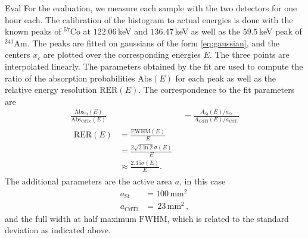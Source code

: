 Eval
For the evaluation, we measure each sample with the two detectors for 
one hour each. The calibration of the histogram to actual energies is 
done with the known peaks of $^{57}$Co at $122.06\,$keV and $136.47\,$keV 
as well as the $59.5\,$keV peak of $^{241}$Am. The peaks are fitted on 
gaussians of the form \eqref{eq:gaussian}, and the centers $x_c$ are 
plotted over the corresponding energies $E$. The three points 
are interpolated linearly. 
The parameters obtained by the fit are used to compute
the ratio of the absorption probabilities $\mathrm{Abs}(E)$ for each peak 
as well as the relative energy resolution $\mathrm{RER}(E)$.
The correspondence to the fit parameters are~\cite{ver}
\begin{align}
    \frac{\mathrm{Abs_{Si}}(E)}{\mathrm{Abs_{CdTe}}(E)}
    &= \frac{A_\mathrm{Si}(E) / a_\mathrm{Si}}{A_\mathrm{CdTl}(E) / a_\mathrm{CdTl}} \\
    \begin{split}
        \mathrm{RER}(E) &= \frac{\mathrm{FWHM}(E)}{E} \\
                        &= \frac{2 \sqrt{2 \ln 2} \sigma(E)}{E} \\
                        &\approx \frac{2.35 \sigma(E)}{E} .
    \end{split}    
\end{align}
The additional parameters are the active area $a$, in this case 
\begin{align}
    a_\mathrm{Si}   &= 100 \, \mathrm{mm^2} \\
    a_\mathrm{CdTl} &= \,23 \, \mathrm{mm^2} \, ,
\end{align}
and the full width at half maximum $\mathrm{FWHM}$, which 
is related to the standard deviation as indicated above. 
